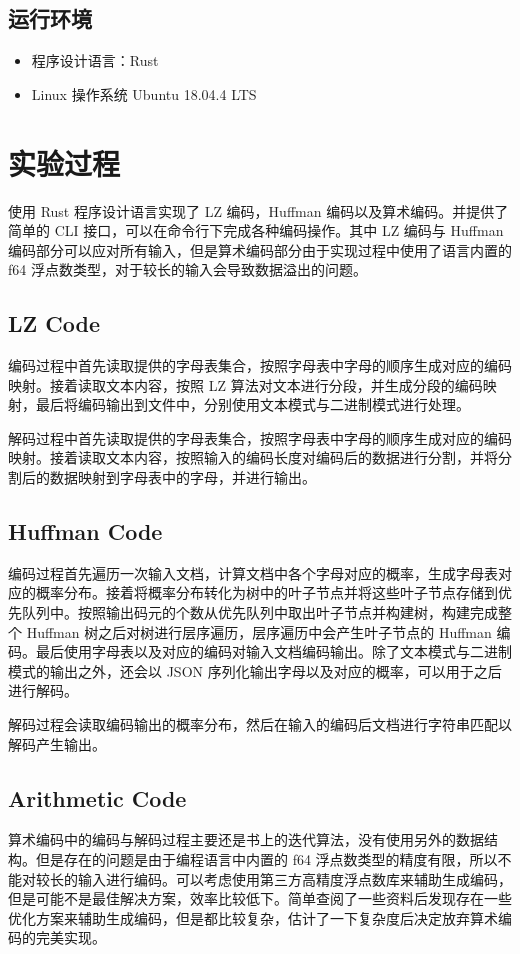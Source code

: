\documentclass{ctexart}
\begin{document}
\subsection{运行环境}

\begin{itemize}
    \item 程序设计语言：Rust
    \item Linux 操作系统 Ubuntu 18.04.4 LTS
\end{itemize}

\section{实验过程}

使用 Rust 程序设计语言实现了 LZ 编码，Huffman 编码以及算术编码。并提供了简单的 CLI 接口，可以在命令行下完成各种编码操作。其中 LZ 编码与 Huffman 编码部分可以应对所有输入，但是算术编码部分由于实现过程中使用了语言内置的 f64 浮点数类型，对于较长的输入会导致数据溢出的问题。

\subsection{LZ Code}

编码过程中首先读取提供的字母表集合，按照字母表中字母的顺序生成对应的编码映射。接着读取文本内容，按照 LZ 算法对文本进行分段，并生成分段的编码映射，最后将编码输出到文件中，分别使用文本模式与二进制模式进行处理。

解码过程中首先读取提供的字母表集合，按照字母表中字母的顺序生成对应的编码映射。接着读取文本内容，按照输入的编码长度对编码后的数据进行分割，并将分割后的数据映射到字母表中的字母，并进行输出。

\subsection{Huffman Code}

编码过程首先遍历一次输入文档，计算文档中各个字母对应的概率，生成字母表对应的概率分布。接着将概率分布转化为树中的叶子节点并将这些叶子节点存储到优先队列中。按照输出码元的个数从优先队列中取出叶子节点并构建树，构建完成整个 Huffman 树之后对树进行层序遍历，层序遍历中会产生叶子节点的 Huffman 编码。最后使用字母表以及对应的编码对输入文档编码输出。除了文本模式与二进制模式的输出之外，还会以 JSON 序列化输出字母以及对应的概率，可以用于之后进行解码。

解码过程会读取编码输出的概率分布，然后在输入的编码后文档进行字符串匹配以解码产生输出。

\subsection{Arithmetic Code}

算术编码中的编码与解码过程主要还是书上的迭代算法，没有使用另外的数据结构。但是存在的问题是由于编程语言中内置的 f64 浮点数类型的精度有限，所以不能对较长的输入进行编码。可以考虑使用第三方高精度浮点数库来辅助生成编码，但是可能不是最佳解决方案，效率比较低下。简单查阅了一些资料后发现存在一些优化方案来辅助生成编码，但是都比较复杂，估计了一下复杂度后决定放弃算术编码的完美实现。
\end{document}
